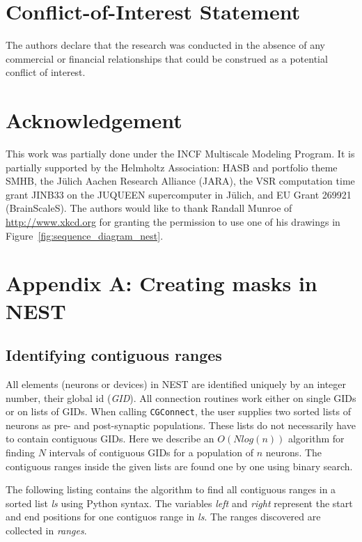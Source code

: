 \documentclass{frontiersSCNS} %
\begin{document}
\section*{Conflict-of-Interest Statement}
The authors declare that the research was conducted in the absence of
any commercial or financial relationships that could be construed as a
potential conflict of interest.

\section*{Acknowledgement}
This work was partially done under the INCF Multiscale Modeling
Program. It is partially supported by the Helmholtz Association: HASB
and portfolio theme SMHB, the Jülich Aachen Research Alliance (JARA),
the VSR computation time grant JINB33 on the JUQUEEN supercomputer in
Jülich, and EU Grant 269921 (BrainScaleS). The authors would like to
thank Randall Munroe of \url{http://www.xkcd.org} for granting the
permission to use one of his drawings in
Figure~\ref{fig:sequence_diagram_nest}.

\section*{Appendix A: Creating masks in NEST}\label{sec:creating_masks}

\subsection*{Identifying contiguous ranges}

All elements (neurons or devices) in NEST are identified uniquely by
an integer number, their global id (\emph{GID}). All connection
routines work either on single GIDs or on lists of GIDs. When calling
\verb|CGConnect|, the user supplies two sorted lists of neurons as
pre- and post-synaptic populations. These lists do not necessarily
have to contain contiguous GIDs.  Here we describe an $O(Nlog(n))$
algorithm for finding $N$ intervals of contiguous GIDs for a
population of $n$ neurons.  The contiguous ranges inside the given
lists are found one by one using binary search.

The following listing contains the algorithm to find all contiguous
ranges in a sorted list \emph{ls} using Python syntax. The variables
\emph{left} and \emph{right} represent the start and end positions for
one contiguos range in \emph{ls}.  The ranges discovered are collected
in \emph{ranges}.
\end{document}

